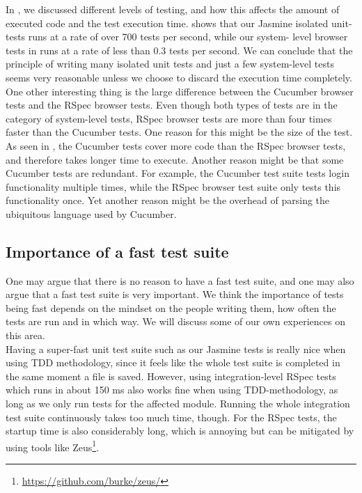 In , we discussed different levels of testing,
and how this affects the amount of executed code and the test execution
time.  shows that our Jasmine isolated unit-
tests runs at a rate of over 700 tests per second, while our system-
level browser tests in  runs at a rate of
less than 0.3 tests per second. We can conclude that the principle of
writing many isolated unit tests and just a few system-level tests seems
very reasonable unless we choose to discard the execution time
completely.\\

One other interesting thing is the large difference between the Cucumber
browser tests and the RSpec browser tests. Even though both types of
tests are in the category of system-level tests, RSpec browser tests are
more than four times faster than the Cucumber tests. One reason for this
might be the size of the test. As seen in ,
the Cucumber tests cover more code than the RSpec browser tests, and
therefore takes longer time to execute. Another reason might be that
some Cucumber tests are redundant. For example, the Cucumber test suite
tests login functionality multiple times, while the RSpec browser test
suite only tests this functionality once. Yet another reason might be
the overhead of parsing the ubiquitous language used by Cucumber.\\


\subsection{Importance of a fast test suite}

One may argue that there is no reason to have a fast test suite, and one
may also argue that a fast test suite is very important. We think the
importance of tests being fast depends on the mindset on the people
writing them, how often the tests are run and in which way. We will
discuss some of our own experiences on this area.\\

Having a super-fast unit test suite such as our Jasmine tests is really
nice when using TDD methodology, since it feels like the whole test
suite is completed in the same moment a file is saved. However, using
integration-level RSpec tests which runs in about 150 ms also works fine
when using TDD-methodology, as long as we only run tests for the
affected module. Running the whole integration test suite continuously
takes too much time, though. For the RSpec tests, the startup time is
also considerably long, which is annoying but can be mitigated by using
tools like Zeus\footnote{\url{https://github.com/burke/zeus/}}.\\

